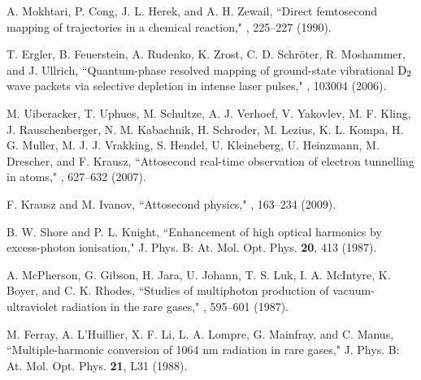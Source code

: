 \documentclass[10pt,letterpaper]{article}
\begin{document}

\begin{thebibliography}{99}
A. Mokhtari, P. Cong, J. L. Herek, and A. H. Zewail, ``Direct femtosecond mapping of trajectories in a chemical reaction," , 225--227 (1990).

T. Ergler, B. Feuerstein, A. Rudenko, K. Zrost, C. D. Schröter, R. Moshammer, and J. Ullrich, ``Quantum-phase resolved mapping of ground-state vibrational ${\rm{D}}_{2}$ wave packets via selective depletion in intense laser pulses," , 103004 (2006).

M. Uiberacker, T. Uphues, M. Schultze, A. J. Verhoef, V. Yakovlev, M. F. Kling, J. Rauschenberger, N. M. Kabachnik, H. Schroder, M. Lezius, K. L. Kompa, H. G. Muller, M. J. J. Vrakking, S. Hendel, U. Kleineberg, U. Heinzmann, M. Drescher, and F. Krausz, ``Attosecond real-time observation of electron tunnelling in atoms," , 627--632 (2007).

F. Krausz and M. Ivanov, ``Attosecond physics," , 163--234 (2009).

B. W. Shore and P. L. Knight, ``Enhancement of high optical harmonics by excess-photon ionisation," J. Phys. B: At. Mol. Opt. Phys. {\bf 20}, 413 (1987).

A. McPherson, G. Gibson, H. Jara, U. Johann, T. S. Luk, I. A. McIntyre, K. Boyer, and C. K. Rhodes, ``Studies of multiphoton production of vacuum-ultraviolet radiation in the rare gases," , 595--601 (1987).

M. Ferray, A. L'Huillier, X. F. Li, L. A. Lompre, G. Mainfray, and C. Manus, ``Multiple-harmonic conversion of 1064 nm radiation in rare gases," J. Phys. B: At. Mol. Opt. Phys. {\bf 21}, L31 (1988).


\end{thebibliography}
\end{document}
